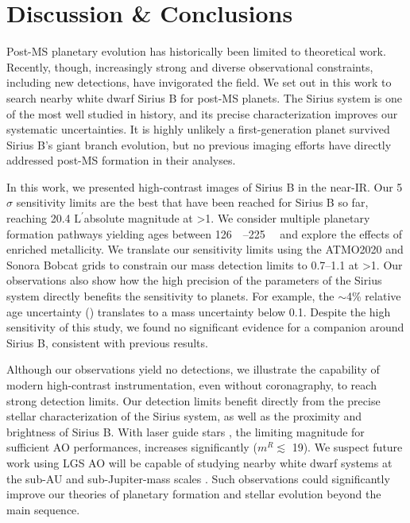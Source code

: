 \documentclass[twocolumn]{aastex631}
\newcommand\Lp{$\mathrm{L}^\prime$}
\begin{document}
\section{Discussion \& Conclusions}\label{sec:conclusion}

Post-MS planetary evolution has historically been limited to theoretical work. Recently, though, increasingly strong and diverse observational constraints, including new detections, have invigorated the field. We set out in this work to search nearby white dwarf Sirius B for post-MS planets. The Sirius system is one of the most well studied in history, and its precise characterization improves our systematic uncertainties. It is highly unlikely a first-generation planet survived Sirius B's giant branch evolution, but no previous imaging efforts have directly addressed post-MS formation in their analyses.

In this work, we presented high-contrast images of Sirius B in the near-IR. Our 5$\sigma$ sensitivity limits are the best that have been reached for Sirius B so far, reaching \num{20.4} \Lp absolute magnitude at \textgreater\qty{1}{\au}. We consider multiple planetary formation pathways yielding ages between \qtyrange{126}{225}{\mega\year} and explore the effects of enriched metallicity. We translate our sensitivity limits using the ATMO2020 and Sonora Bobcat grids to constrain our mass detection limits to \qtyrange{0.7}{1.1}{\jupitermass} at \textgreater\qty{1}{\au}. Our observations also show how the high precision of the parameters of the Sirius system directly benefits the sensitivity to planets. For example, the $\sim$4\% relative age uncertainty () translates to a mass uncertainty below \qty{0.1}{\jupitermass}. Despite the high sensitivity of this study, we found no significant evidence for a companion around Sirius B, consistent with previous results.

Although our observations yield no detections, we illustrate the capability of modern high-contrast instrumentation, even without coronagraphy, to reach strong detection limits. Our detection limits benefit directly from the precise stellar characterization of the Sirius system, as well as the proximity and brightness of Sirius B. With laser guide stars \citep[LGS; e.g.,][]{vandamKeckObservatoryLaser2006,baranecRoboAO2FacilityRapid2018}, the limiting magnitude for sufficient AO performances, increases significantly ($m^R\lesssim$ \num{19}). We suspect future work using LGS AO will be capable of studying nearby white dwarf systems at the sub-AU and sub-Jupiter-mass scales \citep{holberg25ParsecLocal2016}. Such observations could significantly improve our theories of planetary formation and stellar evolution beyond the main sequence.
\end{document}
